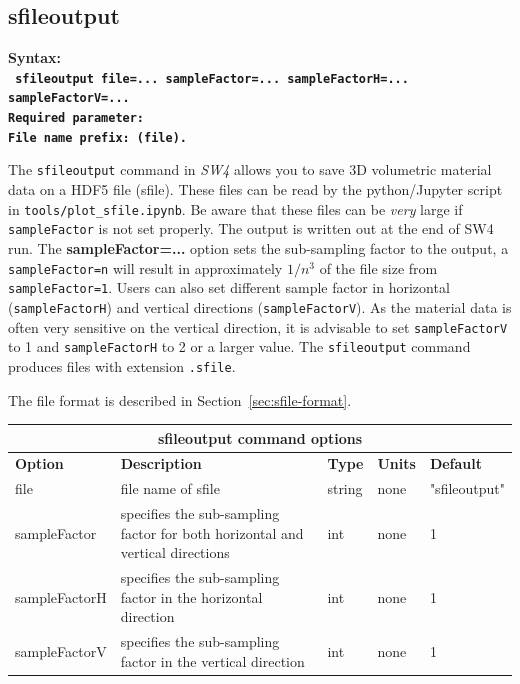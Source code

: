 \documentclass[11pt]{report}
\begin{document}
\subsection{sfileoutput}
\label{keyword:sfileoutput}

\begin{flushleft}
\bf Syntax:\\ \tt 
sfileoutput file=... sampleFactor=...  sampleFactorH=... sampleFactorV=...  \\
\bf Required parameter:\\
\rm File name prefix: (file).
\end{flushleft}
%
The \verb+sfileoutput+ command in \emph{SW4} allows you to save 3D volumetric material data on a HDF5 file (sfile). These files
can be read by the python/Jupyter script in \verb+tools/plot_sfile.ipynb+. 
Be aware that these files can be {\em very} large if \verb+sampleFactor+ is not set properly. 
The output is written out at the end of SW4 run. The {\bf sampleFactor=...} option sets the sub-sampling factor to the output, a \verb+sampleFactor=n+ will result in approximately $1/n^3$ of the file size from \verb+sampleFactor=1+. 
Users can also set different sample factor in horizontal (\verb+sampleFactorH+) and vertical directions (\verb+sampleFactorV+). As the material data is often very sensitive on the vertical direction, it is advisable to set \verb+sampleFactorV+ to 1 and \verb+sampleFactorH+ to 2 or a larger value.
The \verb+sfileoutput+ command produces files with extension \verb+.sfile+.

The file format is described in Section~\ref{sec:sfile-format}.
%
\begin{center}
\begin{tabular}{|l|p{8cm}|l|l|l|} \hline
\multicolumn{5}{|c|}{\bf sfileoutput command options}\\ \hline
{\bf Option} & {\bf Description}          & {\bf Type} & {\bf Units} & {\bf Default} \\ \hline 
\hline
file        & file name of sfile                          & string & none & "sfileoutput" \\ \hline
sampleFactor  & specifies the sub-sampling factor for both horizontal and vertical directions & int & none & 1 \\  \hline
sampleFactorH  & specifies the sub-sampling factor in the horizontal direction & int & none & 1 \\  \hline
sampleFactorV  & specifies the sub-sampling factor in the vertical direction & int & none & 1 \\  \hline

\end{tabular}
\end{center}
%
\end{document}
